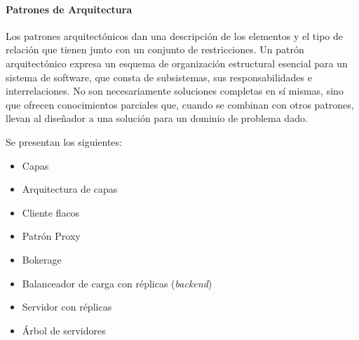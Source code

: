 \paragraph{Patrones de Arquitectura}

Los patrones arquitectónicos  dan una descripción de los elementos y el tipo de relación que tienen junto con un conjunto de restricciones. Un patrón arquitectónico expresa un esquema de organización estructural esencial para un sistema de software, que consta de subsistemas, sus responsabilidades e interrelaciones.
No son necesariamente soluciones completas en sí mismas, sino que
ofrecen conocimientos parciales que, cuando se combinan con otros patrones, llevan al diseñador a una  solución para un dominio de problema dado.

 
	\begin{kaobox}[frametitle=Patrones de Arquitectura]
		Se presentan los siguientes:
		\begin{itemize}
			\item Capas
			\item Arquitectura de capas
			\item Cliente flacos
			\item Patrón Proxy
			\item Bokerage 	
			\item Balanceador de carga con réplicas (\textit{backend})   
			\item Servidor con réplicas  
			\item \'Arbol de servidores		
		\end{itemize} 		
\end{kaobox}  

